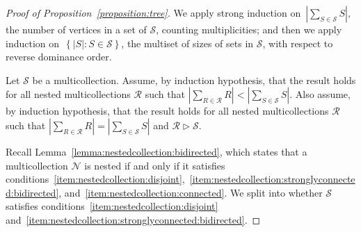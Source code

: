 \begin{proof}[Proof of Proposition~\ref{proposition:tree}]
    We apply strong induction on~\(\left|\sum_{S \in \mathcal{S}} S\right|\), the number of vertices in a set of \(\mathcal{S}\), counting multiplicities;
    and then we apply induction on~\(\left\{|S| : S \in \mathcal{S}\right\}\), the multiset of sizes of sets in \(\mathcal{S}\), with respect to reverse dominance order.

    Let \(\mathcal{S}\) be a multicollection.
            Assume, by induction hypothesis, that the result holds for all nested multicollections \(\mathcal{R}\) such that \(\left|\sum_{R \in \mathcal{R}} R\right| < \left|\sum_{S \in \mathcal{S}} S\right|\).
    Also assume, by induction hypothesis, that the result holds for all nested multicollections \(\mathcal{R}\) such that \(\left|\sum_{R \in \mathcal{R}} R\right| = \left|\sum_{S \in \mathcal{S}} S\right|\) and \(\mathcal{R} \triangleright \mathcal{S}\).

                        Recall Lemma~\ref{lemma:nestedcollection:bidirected},
    which states that a multicollection \(\mathcal{N}\) is nested if and only if it satisfies conditions~\ref{item:nestedcollection:disjoint},~\ref{item:nestedcollection:stronglyconnected:bidirected}, and~\ref{item:nestedcollection:connected}.
    We split into whether \(\mathcal{S}\) satisfies conditions~\ref{item:nestedcollection:disjoint} and~\ref{item:nestedcollection:stronglyconnected:bidirected}.


\end{proof}
